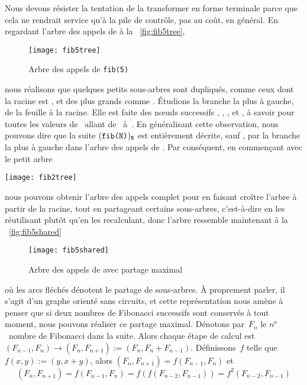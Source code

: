 Nous devons résister la tentation de la transformer en forme terminale
parce que cela ne rendrait service qu'à la pile de contrôle, pas au
coût, en général. En regardant l'arbre des appels de 
à la \fig~\vref{fig:fib5tree},
\begin{figure}[b]
\centering
\texttt{[image: fib5tree]}
\caption{Arbre des appels de \texttt{fib(5)}}
\label{fig:fib5tree}
\end{figure}
nous réalisons que quelques petits sous-arbres sont dupliqués, comme
ceux dont la racine est , et des plus grands comme
. Étudions la branche la plus à gauche, de la feuille
à la racine. Elle est faite des n{\oe}uds successifs ,
, ,  et
, à savoir  pour toutes les valeurs
de~ allant de~ à~. En généralisant
cette observation, nous pouvons dire que la suite
\((\texttt{fib(N)})_{\texttt{N}}\) est entièrement décrite, sauf
, par la branche la plus à gauche dans l'arbre des
appels de . Par conséquent, en commençant avec le
petit arbre
\begin{center}
\texttt{[image: fib2tree]}
\end{center}
nous pouvons obtenir l'arbre des appels complet pour 
en faisant croître l'arbre à partir de la racine, tout en partageant
certains sous-arbres, c'est-à-dire en les réutilisant plutôt qu'en les
recalculant, donc l'arbre ressemble maintenant à la
\fig~\vref{fig:fib5shared}
\begin{figure}
\centering
\texttt{[image: fib5shared]}
\caption{Arbre des appels de  avec partage maximal}
\label{fig:fib5shared}
\end{figure}
où les arcs fléchés dénotent le partage de sous-arbres. À proprement
parler, il s'agit d'un graphe orienté sans circuits, et cette
représentation nous amène à penser que si deux nombres de Fibonacci
successifs sont conservés à tout moment, nous pouvons réaliser ce
partage maximal. Dénotons par~\(F_n\) le \(n^\text{e}\)~nombre de
Fibonacci dans la suite. Alors chaque étape de calcul est
\((F_{n-1},F_{n}) \rightarrow (F_{n}, F_{n+1}) :=
(F_{n},F_{n}+F_{n-1})\). Définissons~\(f\) telle que \(f(x,y) :=
(y,x+y)\), alors \((F_{n},F_{n+1}) = f(F_{n-1},F_{n})\) et
\begin{equation*}
(F_n,F_{n+1}) = f(F_{n-1},F_{n}) = f(f(F_{n-2},F_{n-1})) =
f^2(F_{n-2},F_{n-1})
\end{equation*}
